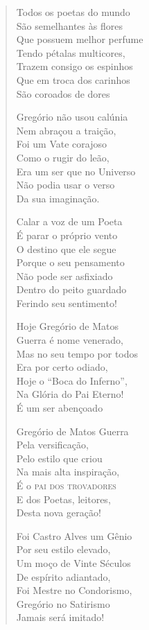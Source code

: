 \begin{verse}
Todos os poetas do mundo \\
São semelhantes às flores \\
Que possuem melhor perfume \\
Tendo pétalas multicores, \\
Trazem consigo os espinhos \\
Que em troca dos carinhos \\
São coroados de dores 

Gregório não usou calúnia \\
Nem abraçou a traição, \\
Foi um Vate corajoso \\
Como o rugir do leão, \\
Era um ser que no Universo \\
Não podia usar o verso \\
Da sua imaginação. 

Calar a voz de um Poeta \\
É parar o próprio vento \\
O destino que ele segue \\
Porque o seu pensamento \\
Não pode ser asfixiado \\
Dentro do peito guardado \\
Ferindo seu sentimento! 


Hoje Gregório de Matos \\
Guerra é nome venerado, \\
Mas no seu tempo por todos \\
Era por certo odiado, \\
Hoje o ``Boca do Inferno'', \\
Na Glória do Pai Eterno! \\
É um ser abençoado 

Gregório de Matos Guerra \\
Pela versificação, \\
Pelo estilo que criou \\
Na mais alta inspiração, \\
É o \textsc{pai dos trovadores} \\
E dos Poetas, leitores, \\
Desta nova geração! 

Foi Castro Alves um Gênio \\
Por seu estilo elevado, \\
Um moço de Vinte Séculos \\
De espírito adiantado, \\
Foi Mestre no Condorismo, \\
Gregório no Satirismo \\
Jamais será imitado! 


\end{verse}
